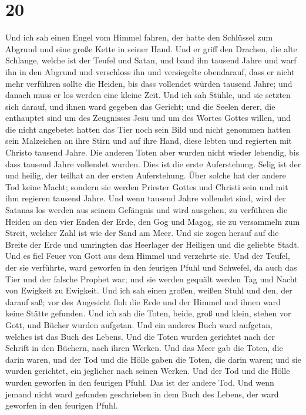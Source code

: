 \hypertarget{section-19}{%
\section{20}\label{section-19}}

 Und ich sah einen Engel vom Himmel fahren, der hatte den
Schlüssel zum Abgrund und eine große Kette in seiner Hand.
 Und er griff den Drachen, die alte Schlange, welche ist
der Teufel und Satan, und band ihn tausend Jahre  und warf
ihn in den Abgrund und verschloss ihn und versiegelte obendarauf, dass
er nicht mehr verführen sollte die Heiden, bis dass vollendet würden
tausend Jahre; und danach muss er los werden eine kleine Zeit.
 Und ich sah Stühle, und sie setzten sich darauf, und
ihnen ward gegeben das Gericht; und die Seelen derer, die enthauptet
sind um des Zeugnisses Jesu und um des Wortes Gottes willen, und die
nicht angebetet hatten das Tier noch sein Bild und nicht genommen hatten
sein Malzeichen an ihre Stirn und auf ihre Hand, diese lebten und
regierten mit Christo tausend Jahre.  Die anderen Toten
aber wurden nicht wieder lebendig, bis dass tausend Jahre vollendet
wurden. Dies ist die erste Auferstehung.  Selig ist der
und heilig, der teilhat an der ersten Auferstehung. Über solche hat der
andere Tod keine Macht; sondern sie werden Priester Gottes und Christi
sein und mit ihm regieren tausend Jahre.  Und wenn tausend
Jahre vollendet sind, wird der Satanas los werden aus seinem Gefängnis
 und wird ausgehen, zu verführen die Heiden an den vier
Enden der Erde, den Gog und Magog, sie zu versammeln zum Streit, welcher
Zahl ist wie der Sand am Meer.  Und sie zogen herauf auf
die Breite der Erde und umringten das Heerlager der Heiligen und die
geliebte Stadt. Und es fiel Feuer von Gott aus dem Himmel und verzehrte
sie.  Und der Teufel, der sie verführte, ward geworfen in
den feurigen Pfuhl und Schwefel, da auch das Tier und der falsche
Prophet war; und sie werden gequält werden Tag und Nacht von Ewigkeit zu
Ewigkeit.  Und ich sah einen großen, weißen Stuhl und
den, der darauf saß; vor des Angesicht floh die Erde und der Himmel und
ihnen ward keine Stätte gefunden.  Und ich sah die Toten,
beide, groß und klein, stehen vor Gott, und Bücher wurden aufgetan. Und
ein anderes Buch ward aufgetan, welches ist das Buch des Lebens. Und die
Toten wurden gerichtet nach der Schrift in den Büchern, nach ihren
Werken.  Und das Meer gab die Toten, die darin waren, und
der Tod und die Hölle gaben die Toten, die darin waren; und sie wurden
gerichtet, ein jeglicher nach seinen Werken.  Und der Tod
und die Hölle wurden geworfen in den feurigen Pfuhl. Das ist der andere
Tod.  Und wenn jemand nicht ward gefunden geschrieben in
dem Buch des Lebens, der ward geworfen in den feurigen Pfuhl.

